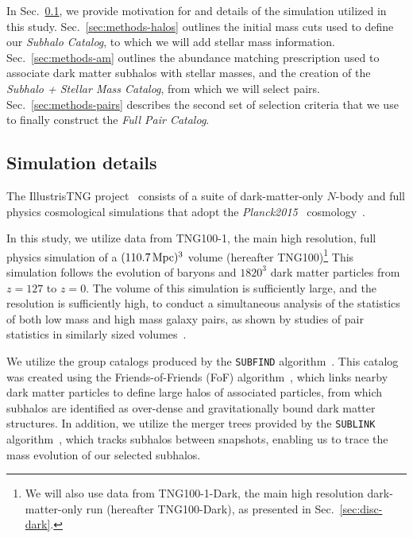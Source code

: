 \documentclass[linenumbers,twocolumn]{aastex631}
\newcommand{\subcat}{\textit{Subhalo Catalog}}
\newcommand{\starcat}{\textit{Subhalo + Stellar Mass Catalog}}
\newcommand{\paircat}{\textit{Full Pair Catalog}}
\begin{document}
In Sec.~\ref{sec:methods-sims}, we provide motivation for and details of the simulation utilized in this study.
Sec.~\ref{sec:methods-halos} outlines the initial mass cuts used to define our \subcat, to which we will add stellar mass information. 
Sec.~\ref{sec:methods-am} outlines the abundance matching prescription used to associate dark matter subhalos with stellar masses, and the creation of the \starcat, from which we will select pairs.
Sec.~\ref{sec:methods-pairs} describes the second set of selection criteria that we use to finally construct the \paircat. 

    \subsection{Simulation details} \label{sec:methods-sims}
    The IllustrisTNG project~\citep{TNG1, TNG2, TNG3, TNG4, TNG5} consists of a suite of dark-matter-only $N$-body and full physics cosmological simulations that adopt the \textit{Planck2015} \lcdm\  cosmology~\citep{Planck2015}.
    
    In this study, we utilize data from TNG100-1, the main high resolution, full physics simulation of a $(110.7\,\mathrm{Mpc})^3$ volume (hereafter TNG100)\footnote{We will also use data from TNG100-1-Dark, the main high resolution dark-matter-only run (hereafter TNG100-Dark), as presented in Sec.~\ref{sec:disc-dark}.} 
    This simulation follows the evolution of baryons and $1820^3$ dark matter particles from $z=127$ to $z=0$.  
    The volume of this simulation is sufficiently large, and the resolution is sufficiently high, to conduct a simultaneous analysis of the statistics of both low mass and high mass galaxy pairs, as shown by studies of pair statistics in similarly sized volumes~\citep{Sales2013,Patel2017a-Orbits,Patel2017b-Masses,Besla2018}. 

    We utilize the group catalogs produced by the \texttt{SUBFIND} algorithm~\citep{Springel2001,Dolag2009}. 
    This catalog was created using the Friends-of-Friends (FoF) algorithm~\citep{Davis1985}, which links nearby dark matter particles to define large halos of associated particles, from which subhalos are identified as over-dense and gravitationally bound dark matter structures.
    In addition, we utilize the merger trees provided by the \texttt{SUBLINK} algorithm~\citep{RG2015}, which tracks subhalos between snapshots, enabling us to trace the mass evolution of our selected subhalos. 
\end{document}
